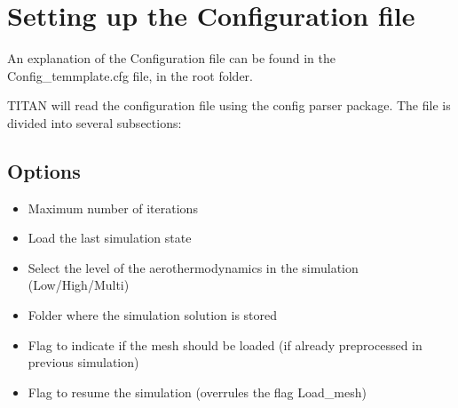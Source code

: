 \documentclass[letterpaper,10pt,english]{sphinxmanual}
\begin{document}
\section{Setting up the Configuration file}
\label{\detokenize{usage:setting-up-the-configuration-file}}
\sphinxAtStartPar
An explanation of the Configuration file can be found in the Config\_temmplate.cfg file, in the root folder.

\sphinxAtStartPar
TITAN will read the configuration file using the config parser package. The file is divided into several subsections:


\subsection{Options}
\label{\detokenize{usage:options}}\begin{itemize}
\item {} 
\sphinxAtStartPar
{} \sphinxhyphen{} Maximum number of iterations

\item {} 
\sphinxAtStartPar
{} \sphinxhyphen{} Load the last simulation state

\item {} 
\sphinxAtStartPar
{} \sphinxhyphen{} Select the level of the aerothermodynamics in the simulation (Low/High/Multi)

\item {} 
\sphinxAtStartPar
{} \sphinxhyphen{} Folder where the simulation solution is stored

\item {} 
\sphinxAtStartPar
{} \sphinxhyphen{} Flag to indicate if the mesh should be loaded (if already pre\sphinxhyphen{}processed in previous simulation)

\item {} 
\sphinxAtStartPar
{} \sphinxhyphen{} Flag to resume the simulation (overrules the flag Load\_mesh)

\end{itemize}
\end{document}
